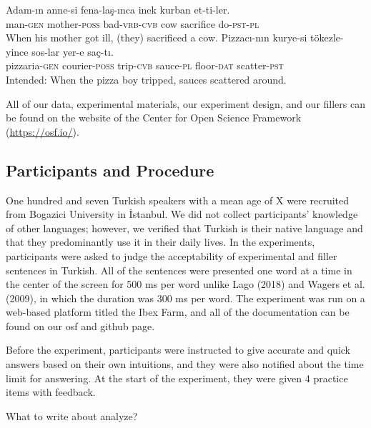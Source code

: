 \documentclass[11pt,a4paper]{article}
\begin{document}
\begin{exe}
\ex
\begin{xlist}
\ex \label{fillera}
\gll Adam-{\i}n anne-si fena-la\c{s}-{\i}nca inek kurban et-ti-ler.\\
man-\textsc{gen} mother-\textsc{poss} bad-\textsc{vrb}-\textsc{cvb} cow sacrifice do-\textsc{pst}-\textsc{pl}\\
\glt When his mother got ill, (they) sacrificed a cow.
\ex \label{fillerb}
\gll *Pizzac{\i}-n{\i}n kurye-si t\"{o}kezle-yince sos-lar yer-e sa\c{c}-t{\i}.\\
pizzaria-\textsc{gen} courier-\textsc{poss} trip-\textsc{cvb} sauce-\textsc{pl} floor-\textsc{dat} scatter-\textsc{pst}\\
\glt Intended: When the pizza boy tripped, sauces scattered around. 
\end{xlist}
\end{exe}

All of our data, experimental materials, our experiment design, and our
fillers can be found on the website of the Center for Open Science
Framework (\url{https://osf.io/}).

\subsection{Participants and
Procedure}\label{participants-and-procedure}

One hundred and seven Turkish speakers with a mean age of X were
recruited from Bogazici University in İstanbul. We did not collect
participants' knowledge of other languages; however, we verified that
Turkish is their native language and that they predominantly use it in
their daily lives. In the experiments, participants were asked to judge
the acceptability of experimental and filler sentences in Turkish. All
of the sentences were presented one word at a time in the center of the
screen for 500 ms per word unlike Lago (2018) and Wagers et al. (2009),
in which the duration was 300 ms per word. The experiment was run on a
web-based platform titled the Ibex Farm, and all of the documentation
can be found on our osf and github page.

Before the experiment, participants were instructed to give accurate and
quick answers based on their own intuitions, and they were also notified
about the time limit for answering. At the start of the experiment, they
were given 4 practice items with feedback.

What to write about analyze?
\end{document}
